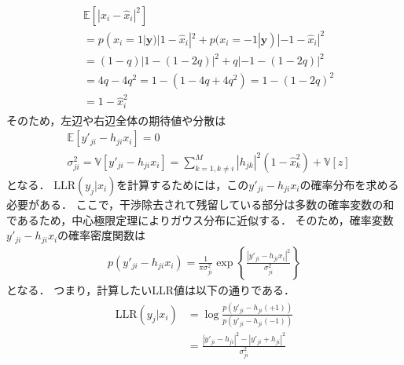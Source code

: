 \documentclass[twocolumn, a4paper]{ieicejsp}
\newcommand{\ABS}[1]{\left|#1\right|}
\newcommand{\Brkts}[1]{\left\{#1\right\}}
\begin{document}
\begin{align}
  \begin{split}
    &\mathbb{E}[|x_i-\hat{x}_i|^2] \\
    &= p(x_i=1 | \mathbf{y}) |1-\hat{x}_i|^2 + p(x_i=-1 | \mathbf{y}) |-1-\hat{x}_i|^2 \\
    &= (1-q) |1 - (1-2q)|^2 + q |-1-(1-2q)|^2 \\
    &= 4q - 4q^2 = 1 - (1 - 4q + 4q^2) = 1 - (1 - 2q)^2 \\
    &= 1 - \hat{x}_i^2
  \end{split}
\end{align}
そのため，左辺や右辺全体の期待値や分散は
\begin{align}
  &\mathbb{E}[y'_{ji} - h_{ji} x_i] = 0 \\
  &\sigma_{ji}^2 = \mathbb{V}[y'_{ji} - h_{ji}x_i] = \sum_{k=1,k\not=i}^{M} |h_{jk}|^2 (1- \hat{x}_k^2) + \mathbb{V}[z]
\end{align}
となる．
$\mathrm{LLR}(y_j | x_i)$を計算するためには，この$y'_{ji} - h_{ji} x_i$の確率分布を求める必要がある．
ここで，干渉除去されて残留している部分は多数の確率変数の和であるため，中心極限定理によりガウス分布に近似する．
そのため，確率変数$y'_{ji} - h_{ji} x_i$の確率密度関数は
\begin{align}
  p(y'_{ji} - h_{ji} x_i) = \frac{1}{\pi \sigma_{ji}^2} \exp\Brkts{\frac{\ABS{y'_{ji} - h_{ji} x_i}^2}{\sigma_{ji}^2}}
\end{align}
となる．
つまり，計算したいLLR値は以下の通りである．
\begin{align}
  \begin{split}
    \mathrm{LLR}(y_j | x_i) &= \log \frac{p(y'_{ji} - h_{ji} (+1))}{p(y'_{ji} - h_{ji} (-1))} \\
    &= \frac{\ABS{y'_{ji} - h_{ji}}^2 - \ABS{y'_{ji} + h_{ji}}^2}{\sigma_{ji}^2}
  \end{split}
\end{align}
\end{document}
